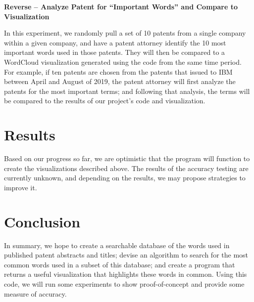 \documentclass{article}
\begin{document}
\textbf{Reverse – Analyze Patent for “Important Words” and Compare to Visualization}

In this experiment, we randomly pull a set of 10 patents from a single company within a given company, and have a patent attorney identify the 10 most important words used in those patents.  They will then be compared to a WordCloud visualization generated using the code from the same time period.  For example, if ten patents are chosen from the patents that issued to IBM between April and August of 2019, the patent attorney will first analyze the patents for the most important terms; and following that analysis, the terms will be compared to the results of our project’s code and visualization. 

\section{Results}
\label{results}

Based on our progress so far, we are optimistic that the program will function to create the visualizations described above.  The results of the accuracy testing are currently unknown, and depending on the results, we may propose strategies to improve it.

\section{Conclusion}
\label{conclusion}

In summary, we hope to create a searchable database of the words used in published patent abstracts and titles; devise an algorithm to search for the most common words used in a subset of this database; and create a program that returns a useful visualization that highlights these words in common.  Using this code, we will run some experiments to show proof-of-concept and provide some measure of accuracy.

 
 




\end{document}
